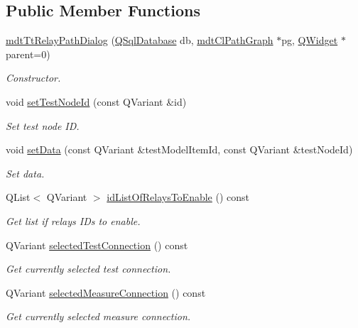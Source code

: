 \subsection*{Public Member Functions}
\begin{DoxyCompactItemize}
\item 
\hyperlink{classmdt_tt_relay_path_dialog_a985f0940fd360d21c8cbcb89119ab916}{mdt\-Tt\-Relay\-Path\-Dialog} (\hyperlink{class_q_sql_database}{Q\-Sql\-Database} db, \hyperlink{classmdt_cl_path_graph}{mdt\-Cl\-Path\-Graph} $\ast$pg, \hyperlink{class_q_widget}{Q\-Widget} $\ast$parent=0)
\begin{DoxyCompactList}\small\item\em Constructor. \end{DoxyCompactList}\item 
void \hyperlink{classmdt_tt_relay_path_dialog_a0047cfd2fea5de76b8a9bf26a67ee45a}{set\-Test\-Node\-Id} (const Q\-Variant \&id)
\begin{DoxyCompactList}\small\item\em Set test node I\-D. \end{DoxyCompactList}\item 
void \hyperlink{classmdt_tt_relay_path_dialog_a188683b80701b54c0691d99bd3e8fe68}{set\-Data} (const Q\-Variant \&test\-Model\-Item\-Id, const Q\-Variant \&test\-Node\-Id)
\begin{DoxyCompactList}\small\item\em Set data. \end{DoxyCompactList}\item 
Q\-List$<$ Q\-Variant $>$ \hyperlink{classmdt_tt_relay_path_dialog_a540948fa111834c1abadafc71048f07c}{id\-List\-Of\-Relays\-To\-Enable} () const 
\begin{DoxyCompactList}\small\item\em Get list if relays I\-Ds to enable. \end{DoxyCompactList}\item 
Q\-Variant \hyperlink{classmdt_tt_relay_path_dialog_a6e9667d6626b6f4d0f87aa3b48bc598e}{selected\-Test\-Connection} () const 
\begin{DoxyCompactList}\small\item\em Get currently selected test connection. \end{DoxyCompactList}\item 
Q\-Variant \hyperlink{classmdt_tt_relay_path_dialog_a8d7b6fb36558f60f9ff09a89b92002dc}{selected\-Measure\-Connection} () const 
\begin{DoxyCompactList}\small\item\em Get currently selected measure connection. \end{DoxyCompactList}\end{DoxyCompactItemize}


